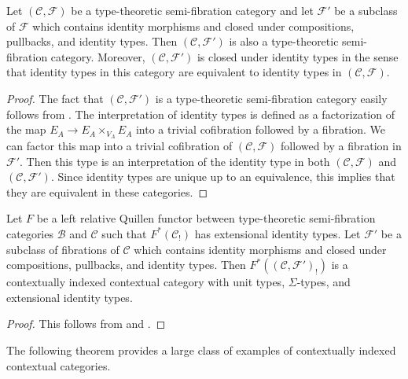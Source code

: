 \documentclass[reqno]{amsart}
\theoremstyle{definition}
\theoremstyle{remark}
\newcommand{\scat}[1]{\mathcal{#1}}
\newcommand{\Fib}{\mathcal{F}}
\numberwithin{figure}{section}
\begin{document}
\begin{prop}
Let $(\scat{C},\Fib)$ be a type-theoretic semi-fibration category and let $\Fib'$ be a subclass of $\Fib$ which contains identity morphisms and closed under compositions, pullbacks, and identity types.
Then $(\scat{C},\Fib')$ is also a type-theoretic semi-fibration category.
Moreover, $(\scat{C},\Fib')$ is closed under identity types in the sense that identity types in this category are equivalent to identity types in $(\scat{C},\Fib)$.
\end{prop}
\begin{proof}
The fact that $(\scat{C},\Fib')$ is a type-theoretic semi-fibration category easily follows from .
The interpretation of identity types is defined as a factorization of the map $E_A \to E_A \times_{V_A} E_A$ into a trivial cofibration followed by a fibration.
We can factor this map into a trivial cofibration of $(\scat{C},\Fib)$ followed by a fibration in $\Fib'$.
Then this type is an interpretation of the identity type in both $(\scat{C},\Fib)$ and $(\scat{C},\Fib')$.
Since identity types are unique up to an equivalence, this implies that they are equivalent in these categories.
\end{proof}

\begin{cor}
Let $F$ be a left relative Quillen functor between type-theoretic semi-fibration categories $\scat{B}$ and $\scat{C}$ such that $F^*(\scat{C}_!)$ has extensional identity types.
Let $\Fib'$ be a subclass of fibrations of $\scat{C}$ which contains identity morphisms and closed under compositions, pullbacks, and identity types.
Then $F^*((\scat{C},\Fib')_!)$ is a contextually indexed contextual category with unit types, $\Sigma$-types, and extensional identity types.
\end{cor}
\begin{proof}
This follows from  and .
\end{proof}

The following theorem provides a large class of examples of contextually indexed contextual categories.
\end{document}
